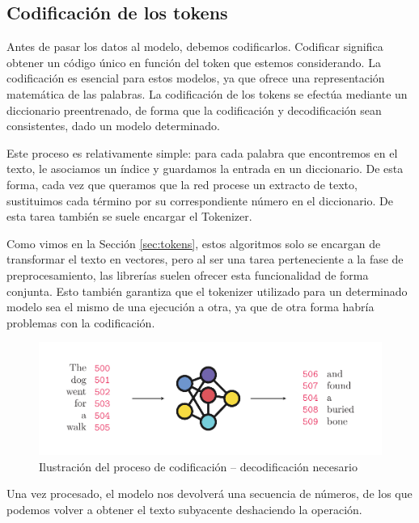 \subsection{Codificación de los tokens}
Antes de pasar los datos al modelo, debemos codificarlos. Codificar significa obtener un código único en función del token que estemos considerando. La codificación es esencial para estos modelos, ya que ofrece una representación matemática de las palabras. La codificación de los tokens se efectúa mediante un diccionario preentrenado, de forma que la codificación y decodificación sean consistentes, dado un modelo determinado.

Este proceso es relativamente simple: para cada palabra que encontremos en el texto, le asociamos un índice y guardamos la entrada en un diccionario. De esta forma, cada vez que queramos que la red procese un extracto de texto, sustituimos cada término por su correspondiente número en el diccionario. De esta tarea también se suele encargar el Tokenizer. 

Como vimos en la Sección \ref{sec:tokens}, estos algoritmos solo se encargan de transformar el texto en vectores, pero al ser una tarea perteneciente a la fase de preprocesamiento, las librerías suelen ofrecer esta funcionalidad de forma conjunta. Esto también garantiza que el tokenizer utilizado para un determinado modelo sea el mismo de una ejecución a otra, ya que de otra forma habría problemas con la codificación.

\begin{figure}[h]
	\centering
	\includegraphics[width=.9\textwidth]{media/tokenizer.pdf}
	\caption{Ilustración del proceso de codificación -- decodificación necesario}
	\label{fig:codification}
\end{figure}

Una vez procesado, el modelo nos devolverá una secuencia de números, de los que podemos volver a obtener el texto subyacente deshaciendo la operación.




